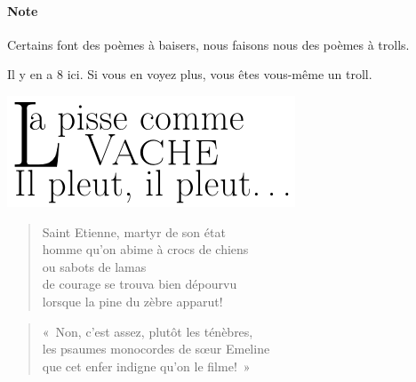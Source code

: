   \paragraph{Note}
    Certains  font des  poèmes  à baisers,  nous  faisons nous  des
    poèmes à trolls.
    
    Il y en a 8 ici. Si  vous en voyez plus, vous êtes vous-même un
    troll.

  \begin{center}
    \includegraphics[scale=0.5]{emerge/lattrine.png}
  \end{center}

  \begin{verse}
    Saint Etienne, martyr de son état\\
    homme qu’on abime à crocs de chiens\\
    ou sabots de lamas\\
    de courage se trouva bien dépourvu\\
    lorsque la pine du zèbre apparut!
  \end{verse}
  \begin{verse}
    «~Non, c’est assez, plutôt les ténèbres,\\
    les psaumes monocordes de sœur Emeline\\
    que cet enfer indigne qu’on le filme!~»
  \end{verse}

